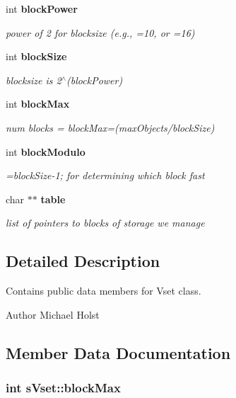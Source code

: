 \begin{DoxyCompactItemize}
int {\bf block\-Power}
\begin{DoxyCompactList}\small\item\em power of 2 for blocksize (e.\-g., =10, or =16) \end{DoxyCompactList}\item 
int {\bf block\-Size}
\begin{DoxyCompactList}\small\item\em blocksize is 2$^\wedge$(block\-Power) \end{DoxyCompactList}\item 
int {\bf block\-Max}
\begin{DoxyCompactList}\small\item\em num blocks = block\-Max=(max\-Objects/block\-Size) \end{DoxyCompactList}\item 
int {\bf block\-Modulo}
\begin{DoxyCompactList}\small\item\em =block\-Size-\/1; for determining which block fast \end{DoxyCompactList}\item 
char $\ast$$\ast$ {\bf table}
\begin{DoxyCompactList}\small\item\em list of pointers to blocks of storage we manage \end{DoxyCompactList}\end{DoxyCompactItemize}


\subsection{Detailed Description}
Contains public data members for Vset class. 

\begin{DoxyAuthor}{Author}
Michael Holst 
\end{DoxyAuthor}


\subsection{Member Data Documentation}
\subsubsection[{block\-Max}]{\setlength{\rightskip}{0pt plus 5cm}int s\-Vset\-::block\-Max}\label{a00006_aa9dd2d95c9e71f01b9f6a0e8c240621a}


